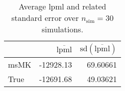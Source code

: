 \begin{table}[H]

\caption{Average lpml and related standard error over $n_{\text{sim}} = 30$ simulations.}
\centering
\begin{tabular}[t]{lrr}
\toprule
  & $\overbar{\text{lpml}}$ & $\text{sd}(\overbar{\text{lpml}})$\\
\midrule
msMK & -12928.13 & 69.60661\\
True & -12691.68 & 49.03621\\
\bottomrule
\end{tabular}
\end{table}